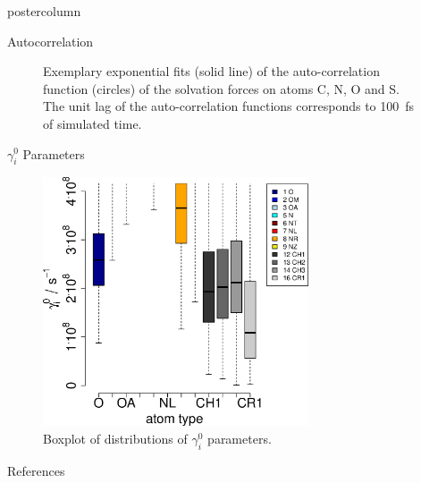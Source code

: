 \documentclass{beamer}
\newcommand{\gam}{$\gamma_i^0$}
\begin{document}
\begin{frame}
\begin{columns}
\begin{column}{.45\textwidth}
\begin{beamercolorbox}[center]{postercolumn}
\begin{minipage}{.98\textwidth}
{\begin{myblock}{Autocorrelation}
\begin{figure}
\begin{minipage}{1.0\textwidth}
\caption{Exemplary exponential fits (solid line) of the auto-correlation function
(circles) of the solvation forces on atoms C, N, O and S. The unit lag of the 
auto-correlation functions corresponds to 100~fs of simulated time.}
\label{fig:expfit}
\end{minipage}
\end{figure}
\end{myblock}\vfill
\begin{myblock}{\gam{} Parameters}
\begin{figure}
\begin{minipage}{1.0\textwidth}
\centering\includegraphics[width=0.7\textwidth]{./boxplot_gamma.all.eps}
\caption{Boxplot of distributions of \gam{} parameters.}
\label{fig:gammadstr}
\end{minipage}
\end{figure}
\end{myblock}\vfill
\begin{myblock}{References}
\footnotesize


\end{myblock}\vfill
}\end{minipage}
\end{beamercolorbox}
\end{column}
\end{columns}
\end{frame}
\end{document}

